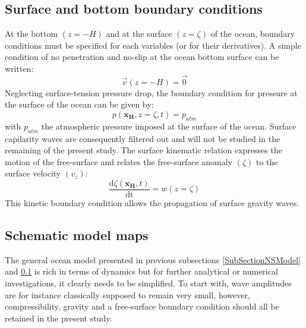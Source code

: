 \documentclass[a4paper,11pt]{article}
\begin{document}
\subsection{Surface and bottom boundary conditions}
\label{SubSectionBC}
At the bottom $(z=-H)$ and at the surface $(z=\zeta)$ of the ocean, boundary conditions must be specified for each variables (or for their derivatives). A simple condition of no penetration and no-slip at the ocean bottom surface can be written:
\begin{equation}
 \displaystyle
 \label{NS_BC0}
  \vec{v}(z=-H)=\vec{0}
\end{equation}
Neglecting surface-tension pressure drop, the boundary condition for pressure at the surface of the ocean can be given by:
\begin{equation}
 \displaystyle
 \label{NS_BC1}
  p(\mathbf{x_{\scriptscriptstyle H}},z=\zeta,t)= p_{atm}
\end{equation}
with $p_{atm}$ the atmospheric pressure imposed at the surface of the ocean. Surface capilarity waves are consequently filtered out and will not be studied in the remaining of the present study. The surface kinematic relation expresses the motion of the free-surface and relates the free-surface anomaly $(\zeta)$ to the surface velocity $(v_z)$:
\begin{equation}
  \displaystyle
  \label{NS_BC2}
  \frac{\textrm{d}\zeta(\mathbf{x_{\scriptscriptstyle H}},t)}{\textrm{dt}}=w(z=\zeta)
\end{equation}
This kinetic boundary condition allows the propagation of surface gravity waves.

\subsection{Schematic model maps}
\label{SubSectionMaps}


The general ocean model presented in previous subsections \ref{SubSectionNSModel} and \ref{SubSectionBC} is rich in terms of dynamics but for further analytical or numerical investigations, it clearly needs to be simplified. To start with, wave amplitudes are for instance classically supposed to remain very small, however, compressibility, gravity and a free-surface boundary condition should all be retained in the present study.\\
\end{document}
